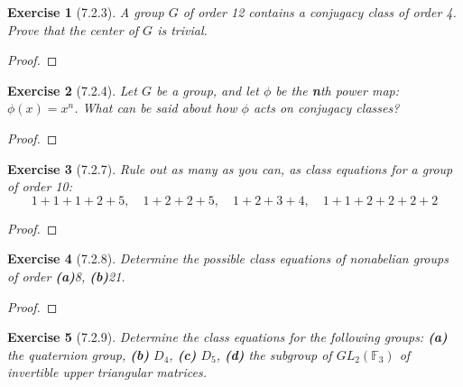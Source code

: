 \documentclass[12pt]{article}
\newtheorem*{exer}{Exercise}
\begin{document}

\begin{exer}[7.2.3]
    A group $G$ of order 12 contains a conjugacy class of order 4. Prove
    that the center of $G$ is trivial.
\end{exer}

\begin{proof}

\end{proof}


\begin{exer}[7.2.4]
    Let $G$ be a group, and let $\phi$ be the \textbf{n}th power
    map:$\phi(x) = x^n$. What can be said about how $\phi$ acts on
    conjugacy classes?
\end{exer}

\begin{proof}

\end{proof}


\begin{exer}[7.2.7]
    Rule out as many as you can, as class equations for a group of order
    10:
    \[
        1 + 1 + 1 + 2 + 5, \quad 1 + 2 + 2 + 5, \quad 1 + 2 + 3 + 4,
        \quad 1 + 1 + 2 + 2 + 2 + 2
    \]
\end{exer}

\begin{proof}

\end{proof}


\begin{exer}[7.2.8]
    Determine the possible class equations of nonabelian groups of order
    \textbf{(a)}8, \textbf{(b)}21.
\end{exer}

\begin{proof}

\end{proof}


\begin{exer}[7.2.9]
    Determine the class equations for the following groups: \textbf{(a)}
    the quaternion group, \textbf{(b)} $D_4$, \textbf{(c)} $D_5$,
    \textbf{(d)} the subgroup of $GL_2(\mathbb{F}_3)$ of invertible
    upper triangular matrices.
\end{exer}
\end{document}
